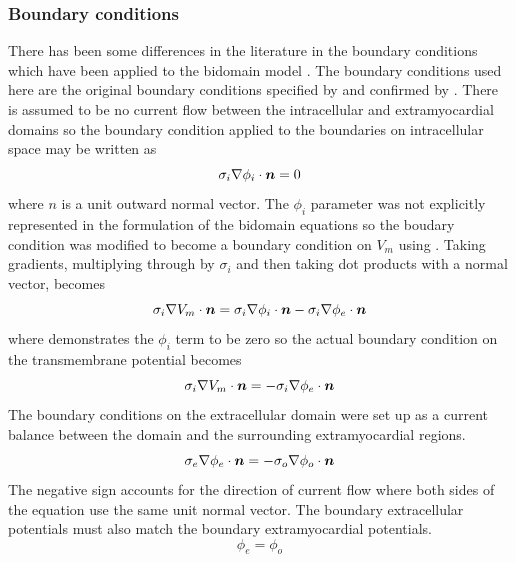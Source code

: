 \subsubsection{Boundary conditions}
There has been some differences in the literature in the boundary conditions
which have been applied to the bidomain model \citet{krassowska:1994}. The boundary
conditions used here are the original boundary conditions specified
by \citet{tung:1978} and confirmed by \citet{krassowska:1994}. There is assumed to be no
current flow between the intracellular and extramyocardial domains so the
boundary condition applied to the boundaries on intracellular space may be
written as
\begin{equation}
  \dotprod{\sigma_i \grad \phi_i}{\vect{n}}=0
  \label{eqn:orig_int_bc}
\end{equation}
where $n$ is a unit outward normal vector. The $\phi_i$ parameter was not
explicitly represented in the formulation of 
the bidomain equations so the boudary condition was modified to become a
boundary condition on $V_m$ using . Taking
gradients, multiplying through by $\sigma_i$ and then taking dot products with
a normal vector, 
 becomes
\begin{equation}
  \dotprod{\sigma_i \grad V_m}{\vect{n}} = \dotprod{\sigma_i \grad \phi_i}{\vect{n}} -
  \dotprod{\sigma_i \grad \phi_e}{\vect{n}} 
\end{equation}
where  demonstrates the $\phi_i$ term to be zero so
the actual boundary condition on the transmembrane potential becomes
\begin{equation}
  \dotprod{\sigma_i \grad V_m}{\vect{n}} = -\dotprod{\sigma_i \grad \phi_e}{\vect{n}} 
  \label{eqn:actual_int_bc}
\end{equation}
The boundary conditions on the extracellular domain were set up as a current
balance between the domain and the surrounding extramyocardial regions. 
\begin{equation}
  \dotprod{\sigma_e \grad \phi_e}{\vect{n}}=-\dotprod{\sigma_o \grad \phi_o}{\vect{n}}
  \label{eqn:orig_ext_bc}
\end{equation}
The negative sign accounts for the direction of current flow where both sides
of the equation use the same unit normal vector. The boundary extracellular
potentials must also match the boundary extramyocardial potentials. 
\begin{equation}
  \phi_e = \phi_o
\end{equation}
